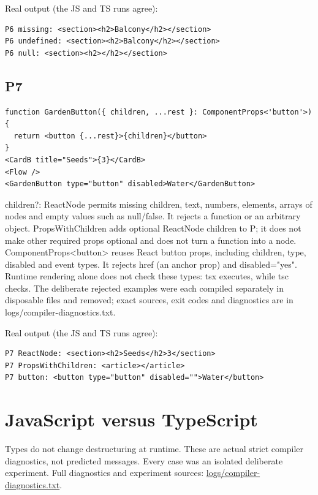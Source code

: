 \documentclass[
  10pt,
  a4paper,
]{article}
\begin{document}
Real output (the JS and TS runs agree):

\begin{lstlisting}
P6 missing: <section><h2>Balcony</h2></section>
P6 undefined: <section><h2>Balcony</h2></section>
P6 null: <section><h2></h2></section>
\end{lstlisting}

\subsection{P7}\label{p7}

\begin{lstlisting}
function GardenButton({ children, ...rest }: ComponentProps<'button'>) {
  return <button {...rest}>{children}</button>
}
<CardB title="Seeds">{3}</CardB>
<Flow />
<GardenButton type="button" disabled>Water</GardenButton>
\end{lstlisting}

children?: ReactNode permits missing children, text, numbers, elements,
arrays of nodes and empty values such as null/false. It rejects a
function or an arbitrary object. PropsWithChildren adds optional
ReactNode children to P; it does not make other required props optional
and does not turn a function into a node.
ComponentProps\textless\textquotesingle button\textquotesingle\textgreater{}
reuses React button props, including children, type, disabled and event
types. It rejects href (an anchor prop) and disabled="yes". Runtime
rendering alone does not check these types: tsx executes, while tsc
checks. The deliberate rejected examples were each compiled separately
in disposable files and removed; exact sources, exit codes and
diagnostics are in logs/compiler-diagnostics.txt.

Real output (the JS and TS runs agree):

\begin{lstlisting}
P7 ReactNode: <section><h2>Seeds</h2>3</section>
P7 PropsWithChildren: <article></article>
P7 button: <button type="button" disabled="">Water</button>
\end{lstlisting}

\section{JavaScript versus
TypeScript}\label{javascript-versus-typescript}

Types do not change destructuring at runtime. These are actual strict
compiler diagnostics, not predicted messages. Every case was an isolated
deliberate experiment. Full diagnostics and experiment sources:
\url{logs/compiler-diagnostics.txt}.
\end{document}
